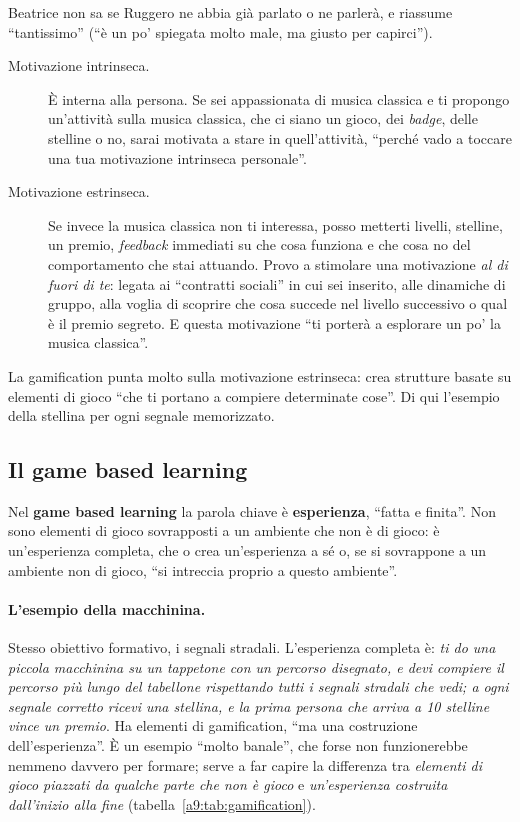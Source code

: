 Beatrice non sa se Ruggero ne abbia già parlato o ne parlerà, e riassume ``tantissimo''
(``è un po' spiegata molto male, ma giusto per capirci'').
\begin{description}
  \item[Motivazione intrinseca.] È interna alla persona. Se sei appassionata di musica
        classica e ti propongo un'attività sulla musica classica, che ci siano un
        gioco, dei \emph{badge}, delle stelline o no, sarai motivata a stare in
        quell'attività, ``perché vado a toccare una tua motivazione intrinseca
        personale''.
  \item[Motivazione estrinseca.] Se invece la musica classica non ti interessa, posso
        metterti livelli, stelline, un premio, \emph{feedback} immediati su che cosa
        funziona e che cosa no del comportamento che stai attuando. Provo a stimolare
        una motivazione \emph{al di fuori di te}: legata ai ``contratti sociali'' in
        cui sei inserito, alle dinamiche di gruppo, alla voglia di scoprire che cosa
        succede nel livello successivo o qual è il premio segreto. E questa
        motivazione ``ti porterà a esplorare un po' la musica classica''.
\end{description}
La gamification punta molto sulla motivazione estrinseca: crea strutture basate su
elementi di gioco ``che ti portano a compiere determinate cose''. Di qui l'esempio
della stellina per ogni segnale memorizzato.

\subsection{Il game based learning}
\label{a9:sec:gbl}

Nel \textbf{game based learning} la parola chiave è \textbf{esperienza}, ``fatta e
finita''. Non sono elementi di gioco sovrapposti a un ambiente che non è di gioco: è
un'esperienza completa, che o crea un'esperienza a sé o, se si sovrappone a un
ambiente non di gioco, ``si intreccia proprio a questo ambiente''.

\paragraph{L'esempio della macchinina.} Stesso obiettivo formativo, i segnali
stradali. L'esperienza completa è: \emph{ti do una piccola macchinina su un tappetone
con un percorso disegnato, e devi compiere il percorso più lungo del tabellone
rispettando tutti i segnali stradali che vedi; a ogni segnale corretto ricevi una
stellina, e la prima persona che arriva a 10 stelline vince un premio}. Ha elementi di
gamification, ``ma una costruzione dell'esperienza''. È un esempio ``molto banale'',
che forse non funzionerebbe nemmeno davvero per formare; serve a far capire la
differenza tra \emph{elementi di gioco piazzati da qualche parte che non è gioco} e
\emph{un'esperienza costruita dall'inizio alla fine} (tabella~\ref{a9:tab:gamification}).

